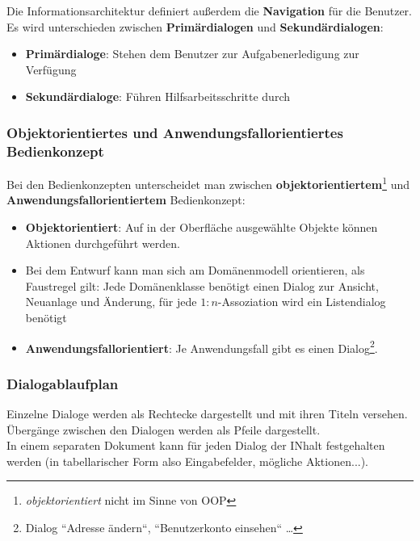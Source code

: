 \noindent
Die Informationsarchitektur definiert außerdem die \textbf{Navigation} für die Benutzer.\\

\noindent
Es wird unterschieden zwischen \textbf{Primärdialogen} und \textbf{Sekundärdialogen}:

\begin{itemize}
    \item \textbf{Primärdialoge}: Stehen dem Benutzer zur Aufgabenerledigung zur Verfügung
    \item \textbf{Sekundärdialoge}: Führen Hilfsarbeitsschritte durch
\end{itemize}

\subsubsection*{Objektorientiertes und Anwendungsfallorientiertes Bedienkonzept}
Bei den Bedienkonzepten unterscheidet man zwischen \textbf{objektorientiertem}\footnote{
\textit{objektorientiert} nicht im Sinne von OOP
} und \textbf{Anwendungsfallorientiertem} Bedienkonzept:

\begin{itemize}
    \item \textbf{Objektorientiert}: Auf in der Oberfläche ausgewählte Objekte können Aktionen durchgeführt werden.
    \item[] Bei dem Entwurf kann man sich am Domänenmodell orientieren, als Faustregel gilt: Jede Domänenklasse benötigt einen Dialog zur Ansicht, Neuanlage und Änderung, für jede $1:n$-Assoziation wird ein Listendialog benötigt
    \item \textbf{Anwendungsfallorientiert}: Je Anwendungsfall gibt es einen Dialog\footnote{
    Dialog ``Adresse ändern``, ``Benutzerkonto einsehen`` \ldots
    }.
\end{itemize}


\subsubsection*{Dialogablaufplan}
Einzelne Dialoge werden als Rechtecke dargestellt und mit ihren Titeln versehen.\\
Übergänge zwischen den Dialogen werden als Pfeile dargestellt.\\
In einem separaten Dokument kann für jeden Dialog der INhalt festgehalten werden (in tabellarischer Form also Eingabefelder, mögliche Aktionen...).

